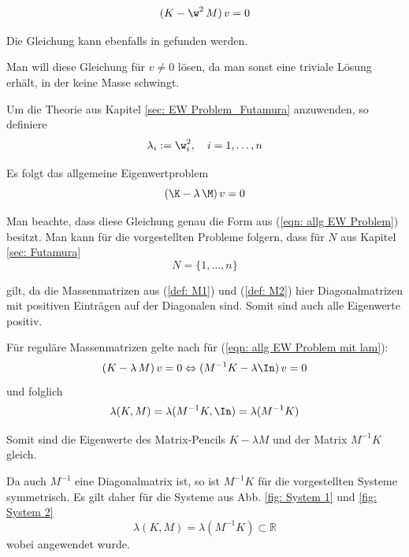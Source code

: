 \documentclass[a4paper,12pt]{report}
\newcommand{\R}{\mathbb R}
\newcommand{\inv}{^{-1}}
\newcommand{\1}{\mathds{1}}
\theoremstyle{plain} %
\theoremstyle{definition} %
\theoremstyle{remark}
\begin{document}
            \begin{equation}
                  \label{eqn: allg EW Problem mit w}
                  (K-\w^2\,M)\,v = 0
            \end{equation}

            Die Gleichung kann ebenfalls in \cite[S. 380]{maschinendynamikDresig} gefunden werden.

            Man will diese Gleichung für $v\ne 0$ lösen, da man sonst eine triviale Lösung erhält, in der keine Masse schwingt.

            Um die Theorie aus Kapitel \ref{sec: EW Problem_Futamura} anzuwenden, so definiere
            $$\lambda_i := \w_i^2,\quad i=1,\dots,n$$

            Es folgt das allgemeine Eigenwertproblem
            \begin{equation}
                  \label{eqn: allg EW Problem mit lam}
                  (\K-\lambda\,\M)\,v = 0
            \end{equation}

            Man beachte, dass diese Gleichung genau die Form aus (\ref{eqn: allg EW Problem}) besitzt.
            Man kann für die vorgestellten Probleme folgern, dass für $N$ aus Kapitel \ref{sec: Futamura}
            $$N=\{1,\dots,n\}$$

            gilt, da die Massenmatrizen aus (\ref{def: M1}) und (\ref{def: M2}) hier Diagonalmatrizen mit positiven Einträgen auf der Diagonalen sind. Somit sind auch alle Eigenwerte positiv.

            Für reguläre Massenmatrizen gelte nach \cite[S. 376]{matrixGolub} für (\ref{eqn: allg EW Problem mit lam}):
            $$(K-\lambda\,M)\,v = 0 \Leftrightarrow (M\inv K-\lambda\In)\,v=0$$
            und folglich
            \begin{equation}
                  \label{eqn: Ew Pencil gleich Ew Matrix}
                  \lambda(K, M) =\lambda(M\inv K,\In) = \lambda(M\inv K)
            \end{equation}

            Somit sind die Eigenwerte des Matrix-Pencils $K-\lambda M$ und der Matrix $M\inv K$ gleich.

            Da auch $M\inv$ eine Diagonalmatrix ist, so ist $M\inv K$ für die vorgestellten Systeme symmetrisch.
            Es gilt daher für die Systeme aus Abb. \ref{fig: System 1} und \ref{fig: System 2}
            \begin{equation}
                  \label{eqn: alle Ew reell}
                  \lambda(K, M) = \lambda(M\inv K) \subset \R
            \end{equation}
            wobei \cite[S. 393]{matrixGolub} angewendet wurde.
\end{document}
